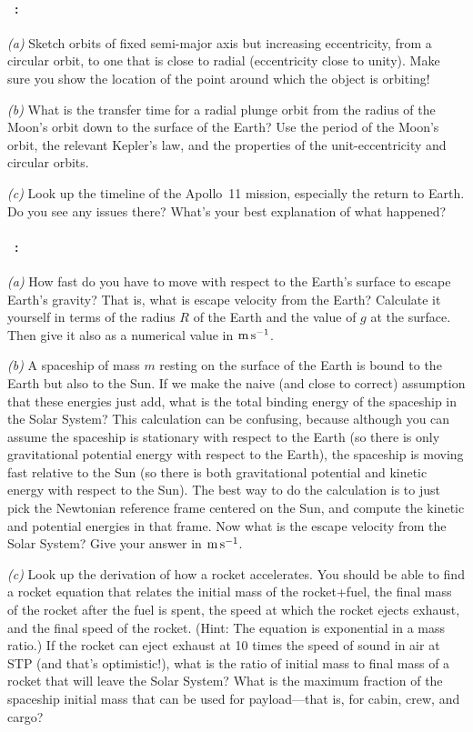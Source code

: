 \documentclass[12pt]{article}
\begin{document}
\paragraph{\problemname~\theproblem:}%
\textsl{(a)}
Sketch orbits of fixed semi-major axis but increasing
eccentricity, from a circular orbit, to one that is close to radial
(eccentricity close to unity). Make sure you show the location of
the point around which the object is orbiting!

\textsl{(b)}
What is the transfer time for a radial plunge orbit
from the radius of the Moon's orbit down to the surface of the Earth?
Use the period of the Moon's orbit, the relevant  Kepler's law, and
the properties of the unit-eccentricity and circular orbits.

\textsl{(c)}
Look up the timeline of the Apollo~11 mission, especially
the return to Earth.  Do you see any issues there? What's your best
explanation of what happened?

\paragraph{\problemname~\theproblem:}%
\textsl{(a)}
How fast do you have to move with respect to the Earth's surface to
escape Earth's gravity? That is, what is escape velocity from the Earth?
Calculate it yourself in terms of the radius $R$ of the Earth and the
value of $g$ at the surface. Then give it also as a numerical value in $\mathrm{m}\,\mathrm{s}^{-1}$.

\textsl{(b)} A spaceship of mass $m$ resting on the surface of the
Earth is bound to the Earth but also to the Sun. If we make
the naive (and close to correct) assumption that these energies just
add, what is the total binding energy of the spaceship in the Solar
System? This calculation can be confusing, because although you can assume
the spaceship is stationary with respect to the Earth (so there is
only gravitational potential energy with respect to the Earth), the
spaceship is moving fast relative to the Sun (so there is both
gravitational potential and kinetic energy with respect to the
Sun). The best way to do the calculation is to just pick the Newtonian reference
frame centered on the Sun, and compute the kinetic and potential
energies in that frame. Now what is the escape velocity from the Solar
System? Give your answer in $\mathrm{m}\,\mathrm{s}^{-1}$.

\textsl{(c)} Look up the derivation of how a rocket accelerates. You
should be able to find a rocket equation that relates the initial mass
of the rocket+fuel, the final mass of the rocket after the fuel is
spent, the speed at which the rocket ejects exhaust, and the final
speed of the rocket. (Hint: The equation is exponential in a mass
ratio.) If the rocket can eject exhaust at 10 times the speed of sound
in air at STP (and that's optimistic!), what is the ratio of initial
mass to final mass of a rocket that will leave the Solar System? What
is the maximum fraction of the spaceship initial mass that can be used
for payload---that is, for cabin, crew, and cargo?
\end{document}
